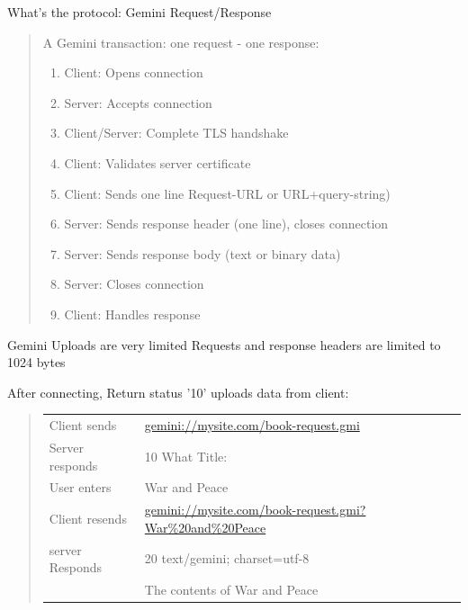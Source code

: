 \documentclass[presentation, 11pt,  aspectratio=169]{beamer}
\begin{document}
\begin{frame}[label={sec:orgb9981e1}]{What's the protocol: Gemini Request/Response}
\begin{quote}
A Gemini transaction: one request - one response:\\

\begin{enumerate}
\item Client: Opens connection\\
\item Server: Accepts connection\\
\item Client/Server: Complete TLS handshake\\
\item Client: Validates server certificate\\
\item \alert{Client: Sends one line Request-URL or URL+query-string)}\\
\item \alert{Server: Sends response header (one line), closes connection}\\
\item \alert{Server: Sends response body (text or binary data)}\\
\item Server: Closes connection\\
\item \alert{Client: Handles response}\\
\end{enumerate}
\end{quote}
\end{frame}

\begin{frame}[label={sec:orgaafd885}]{Gemini Uploads are very limited}
Requests and response headers are limited to 1024 bytes\\

\begin{block}{After connecting, Return status '10' uploads data from client:}
\begin{quote}
\begin{center}
\begin{tabular}{ll}
 & \\
\hline
Client sends & \alert{\href{gemini://mysite.com/book-request.gmi}{gemini://mysite.com/book-request.gmi}}\\
Server responds & \alert{10 What Title:}\\
\hline
User enters & War and Peace\\
Client resends & \alert{\href{gemini://mysite.com/book-request.gmi?War\%20and\%20Peace}{gemini://mysite.com/book-request.gmi?War\%20and\%20Peace}}\\
\hline
server Responds & \alert{20 text/gemini; charset=utf-8}\\
 & The contents of War and Peace\\
\hline
\end{tabular}
\end{center}
\end{quote}
\end{block}
\end{frame}
\end{document}

